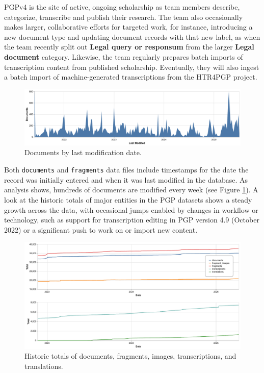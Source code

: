 \documentclass{article}
\begin{document}
PGPv4 is the site of active, ongoing scholarship as team members describe, categorize, transcribe and publish  their research. The team also occasionally makes larger, collaborative efforts for targeted work, for instance, introducing a new document type and updating document records with that new label, as when the team recently split out \textbf{Legal query or responsum} from the larger \textbf{Legal document} category. Likewise, the team regularly prepares batch imports of transcription content from published scholarship. Eventually, they will also ingest a batch import of machine-generated transcriptions from the HTR4PGP project.

\begin{figure}[!hbt]
  \includegraphics[width=\textwidth]{charts/docs_last_modified.pdf}
  \centering
  \caption{Documents by last modification date.}
  \label{fig:docs-last-modified}
\end{figure}

Both \texttt{documents} and \texttt{fragments} data files include timestamps for the date the record was initially entered and when it was last modified in the database. As analysis shows, hundreds of documents are modified every week (see Figure \ref{fig:docs-last-modified}). A look at the historic totals of major entities in the PGP datasets shows a steady growth across the data, with occasional jumps enabled by changes in workflow or technology, such as support for transcription editing in PGP version 4.9 (October 2022) or a significant push to work on or import new content.

\begin{figure}[!hbt]
  \includegraphics[width=\textwidth]{charts/combined_totals_historic.pdf}
  \centering
  \caption{Historic totals of documents, fragments, images, transcriptions, and translations.}
  \label{fig:historic-totals}
\end{figure}
\end{document}
